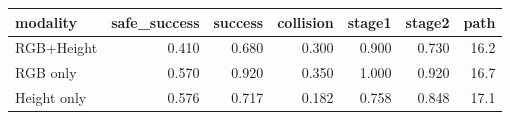 \begin{tabular}{lrrrrrr}
\toprule
modality & safe_success & success & collision & stage1 & stage2 & path \\
\midrule
RGB+Height & 0.410 & 0.680 & 0.300 & 0.900 & 0.730 & 16.2 \\
RGB only & 0.570 & 0.920 & 0.350 & 1.000 & 0.920 & 16.7 \\
Height only & 0.576 & 0.717 & 0.182 & 0.758 & 0.848 & 17.1 \\
\bottomrule
\end{tabular}
